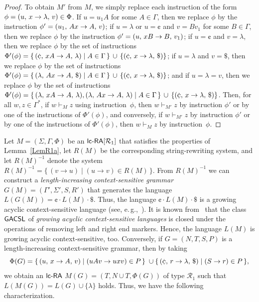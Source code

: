 \begin{proof}
To obtain $M'$ from $M$, we simply replace each instruction of the form $\phi=(u,\,x\rightarrow\lambda,\,v)\in \Phi$. If $u=u_1A$ for some $A\in\Gamma$, then we replace $\phi$ by the instruction $\phi'=(u_1,\,Ax\rightarrow A,\,v)$; if $u=\lambda$ or $u=\cent$ and $v=Bv_1$ for some $B\in\Gamma$, then we replace $\phi$ by the instruction $\phi'=(u,\,xB\rightarrow B,\,v_1)$; if $u =\cent$ and $v=\lambda$, then we replace $\phi$ by the set of instructions $\Phi'(\phi) = \{\,\rarule{\cent}{xA}{A}{\lambda}\mid A\in \Gamma\,\} \,\cup\,\{\rarule{\cent}{x}{\lambda}{\$}\}$; if $u=\lambda$ and $v=\$$, then we replace $\phi$ by the set of instructions $\Phi'(\phi) = \{\,\rarule{\lambda}{Ax}{A}{\$}\mid A\in \Gamma\,\} \,\cup\,\{\rarule{\cent}{x}{\lambda}{\$}\}$; and if $u=\lambda=v$, then we replace $\phi$ by the set of instructions $\Phi'(\phi) = \{\,\rarule{\lambda}{xA}{A}{\lambda},\rarule{\lambda}{Ax}{A}{\lambda}\mid A\in \Gamma\,\} \,\cup\,\{\rarule{\cent}{x}{\lambda}{\$}\}$. Then, for all $w,z\in\Gamma^*$, if $w\vdash_M z$ using instruction~$\phi$, then $w\vdash_{M'} z$ by instruction $\phi'$ or by one of the instructions of $\Phi'(\phi)$, and conversely, if $w\vdash_{M'} z$ by instruction $\phi'$ or by one of the instructions of $\Phi'(\phi)$, then $w\vdash_M z$ by instruction~$\phi$.
\end{proof}

Let $M=(\Sigma,\Gamma,\Phi)$ be an $\lcRA[1]$ that satisfies the properties of Lemma~\ref{LemR1a}, let $R(M)$ be the corresponding string-rewriting system, and let $R(M)^{-1}$ denote the system $R(M)^{-1} = \{\,(v\to u) \mid (u\to v)\in R(M)\,\}.$ From $R(M)^{-1}$ we can construct a \emph{length-increasing context-sensitive grammar} $G(M) = (\Gamma',\Sigma',S,R')$ that generates the language $L(G(M)) = \cent\cdot L(M)\cdot\$$. Thus, the language $\cent\cdot L(M)\cdot\$$ is a growing acyclic context-sensitive language  (see, e.\,g.,~\cite{NiWo01}). It is known from~\cite{BunHabil} that the class \index{$\GACSL$}$\GACSL$ of \emph{growing acyclic context-sensitive languages} is closed under the operations of removing left and right end markers. Hence, the language $L(M)$ is growing acyclic context-sensitive, too. Conversely, if $G=(N,T,S,P)$ is a length-increasing context-sensitive grammar, then by taking
$$
\Phi(G)  =  \{\,\rarule{u}{x}{A}{v} \mid (uAv\to uxv)\in P\,\}\; \cup
            \{\,\rarule{\cent}{r}{\lambda}{\$}\mid (S\to r)\in P\,\},
$$
we obtain an $\lcRA$ $M(G) = (T,N\cup T,\Phi(G))$ of type $\mathcal{R}_1$ such that $L(M(G)) = L(G)\cup\{\lambda\}$ holds. Thus,  we have the following characterization.

